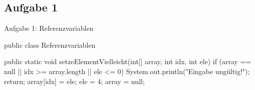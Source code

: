 \subsection{Aufgabe 1}
{\taskenum
\begin{frame}[fragile]{Aufgabe 1: Referenzvariablen}
\vspace*{-4mm}
\begin{plainjava}[multicols=2,lineskip=-.5pt,prebreak={},numbers=left,numbersep=2pt]
public class Referenzvariablen {
  public static void setzeElementVielleicht(int[] array, int idx, int ele) {
    if (array == null || idx >= array.length || ele <= 0) {
      System.out.println("Eingabe ungültig!");
      return;
    }
    array[idx] = ele;
    ele = 4;
    array = null;
  }

}
\end{plainjava}
\end{frame}}

